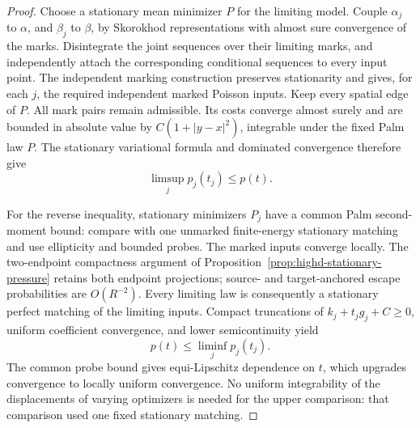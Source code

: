 \documentclass[11pt,reqno]{amsart}
\theoremstyle{definition}
\theoremstyle{remark}
\numberwithin{equation}{section}
\begin{document}
\begin{proof}
Choose a stationary mean minimizer \(P\) for the limiting model.
Couple \(\alpha_j\) to \(\alpha\), and \(\beta_j\) to \(\beta\),
by Skorokhod representations with almost sure convergence of the
marks. Disintegrate the joint sequences over their limiting marks,
and independently attach the corresponding conditional sequences
to every input point. The independent marking construction preserves
stationarity and gives, for each \(j\), the required independent
marked Poisson inputs. Keep every spatial edge of \(P\).
All mark pairs remain admissible. Its costs converge almost surely
and are bounded in absolute value by \(C(1+|y-x|^2)\), integrable
under the fixed Palm law \(P\). The stationary variational formula
and dominated convergence therefore give
\[
                  \limsup_j p_j(t_j)\le p(t).
\]

For the reverse inequality, stationary minimizers \(P_j\) have a
common Palm second-moment bound: compare with one unmarked
finite-energy stationary matching and use ellipticity and bounded
probes. The marked inputs converge locally. The two-endpoint
compactness argument of
Proposition~\ref{prop:highd-stationary-pressure} retains both endpoint
projections; source- and target-anchored escape probabilities are
\(O(R^{-2})\). Every limiting law is consequently a stationary
perfect matching of the limiting inputs. Compact truncations of
\(k_j+t_jg_j+C\ge0\), uniform coefficient convergence, and lower
semicontinuity yield
\[
                 p(t)\le\liminf_j p_j(t_j).
\]
The common probe bound gives equi-Lipschitz dependence on \(t\),
which upgrades convergence to locally uniform convergence.
No uniform integrability of the displacements of varying optimizers
is needed for the upper comparison: that comparison used one fixed
stationary matching.
\end{proof}
\end{document}
